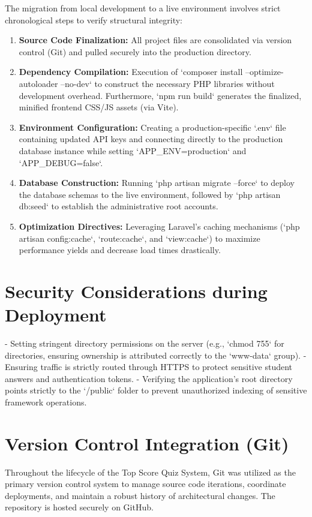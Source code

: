 The migration from local development to a live environment involves strict chronological steps to verify structural integrity:
\begin{enumerate}
    \item \textbf{Source Code Finalization:} All project files are consolidated via version control (Git) and pulled securely into the production directory.
    \item \textbf{Dependency Compilation:} Execution of `composer install --optimize-autoloader --no-dev` to construct the necessary PHP libraries without development overhead. Furthermore, `npm run build` generates the finalized, minified frontend CSS/JS assets (via Vite).
    \item \textbf{Environment Configuration:} Creating a production-specific `.env` file containing updated API keys and connecting directly to the production database instance while setting `APP_ENV=production` and `APP_DEBUG=false`.
    \item \textbf{Database Construction:} Running `php artisan migrate --force` to deploy the database schemas to the live environment, followed by `php artisan db:seed` to establish the administrative root accounts.
    \item \textbf{Optimization Directives:} Leveraging Laravel's caching mechanisms (`php artisan config:cache`, `route:cache`, and `view:cache`) to maximize performance yields and decrease load times drastically.
\end{enumerate}

\section{Security Considerations during Deployment}
- Setting stringent directory permissions on the server (e.g., `chmod 755` for directories, ensuring ownership is attributed correctly to the `www-data` group).
- Ensuring traffic is strictly routed through HTTPS to protect sensitive student answers and authentication tokens.
- Verifying the application's root directory points strictly to the `/public` folder to prevent unauthorized indexing of sensitive framework operations. 

\section{Version Control Integration (Git)}

Throughout the lifecycle of the Top Score Quiz System, Git was utilized as the primary version control system to manage source code iterations, coordinate deployments, and maintain a robust history of architectural changes. The repository is hosted securely on GitHub.


